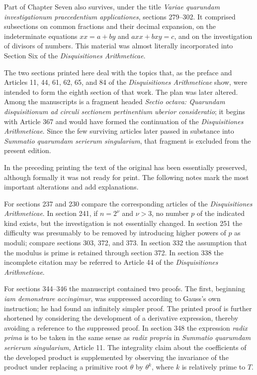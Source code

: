\documentclass[12pt]{article}
\begin{document}
Part of Chapter Seven also survives, under the title \emph{Variae quarundam investigationum praecedentium applicationes}, sections 279--302. It comprised subsections on common fractions and their decimal expansion, on the indeterminate equations $xx=a+by$ and $axx+bxy=c$, and on the investigation of divisors of numbers. This material was almost literally incorporated into Section Six of the \emph{Disquisitiones Arithmeticae}.

The two sections printed here deal with the topics that, as the preface and Articles 11, 44, 61, 62, 65, and 84 of the \emph{Disquisitiones Arithmeticae} show, were intended to form the eighth section of that work. The plan was later altered. Among the manuscripts is a fragment headed \emph{Sectio octava: Quarundam disquisitionum ad circuli sectionem pertinentium uberior consideratio}; it begins with Article 367 and would have formed the continuation of the \emph{Disquisitiones Arithmeticae}. Since the few surviving articles later passed in substance into \emph{Summatio quarumdam serierum singularium}, that fragment is excluded from the present edition.

In the preceding printing the text of the original has been essentially preserved, although formally it was not ready for print. The following notes mark the most important alterations and add explanations.

For sections 237 and 230 compare the corresponding articles of the \emph{Disquisitiones Arithmeticae}. In section 241, if $n=2^\nu$ and $\nu>3$, no number $p$ of the indicated kind exists, but the investigation is not essentially changed. In section 251 the difficulty was presumably to be removed by introducing higher powers of $p$ as moduli; compare sections 303, 372, and 373. In section 332 the assumption that the modulus is prime is retained through section 372. In section 338 the incomplete citation may be referred to Article 44 of the \emph{Disquisitiones Arithmeticae}.

For sections 344--346 the manuscript contained two proofs. The first, beginning \emph{iam demonstrare accingimur}, was suppressed according to Gauss's own instruction; he had found an infinitely simpler proof. The printed proof is further shortened by considering the development of a derivative expression, thereby avoiding a reference to the suppressed proof. In section 348 the expression \emph{radix prima} is to be taken in the same sense as \emph{radix propria} in \emph{Summatio quarumdam serierum singularium}, Article 11. The integrality claim about the coefficients of the developed product is supplemented by observing the invariance of the product under replacing a primitive root $\theta$ by $\theta^k$, where $k$ is relatively prime to $T$.
\end{document}
